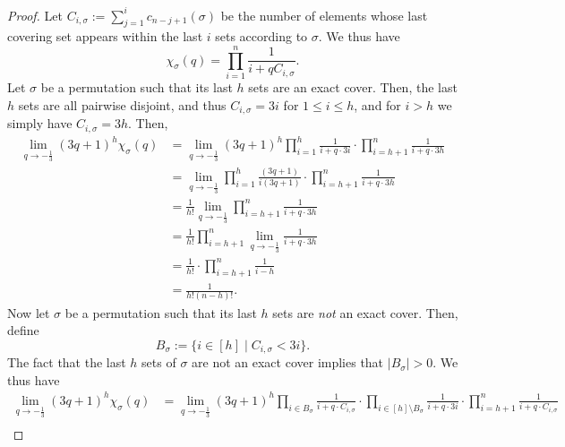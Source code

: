\documentclass[11pt]{amsart}
\begin{document}
\begin{proof}
Let $C_{i, \sigma} := \sum_{j=1}^i c_{n-j+1}(\sigma)$ be the number of elements whose last covering set appears within the last $i$ sets according to $\sigma$. We thus have
\[
    \chi_{\sigma}(q) =  \prod_{i=1}^n \frac{1}{i + q C_{i, \sigma} }.
\]
Let $\sigma$ be a permutation such that its last $h$ sets are an exact cover. Then, the last $h$ sets are all pairwise disjoint, and thus $C_{i, \sigma} = 3i$ for $1 \leq i \leq h$, and for $i > h$ we simply have $C_{i, \sigma} = 3h$.
Then,
 \begin{align*}
     \lim_{q \to -\frac{1}{3}} (3q+1)^h\chi_{\sigma}(q) &= \lim_{q \to -\frac{1}{3}}  (3q+1)^h \prod_{i=1}^{h} \frac{1}{i + q\cdot 3i }  \cdot \prod_{i=h+1}^{n} \frac{1}{i + q\cdot 3h }\\
     &= \lim_{q \to -\frac{1}{3}}   \prod_{i=1}^{h} \frac{(3q+1)}{i(3q+1)}  \cdot \prod_{i=h+1}^{n} \frac{1}{i + q\cdot 3h }\\
     &= \frac{1}{h!} \lim_{q \to -\frac{1}{3}}  \prod_{i=h+1}^{n} \frac{1}{i + q\cdot 3h }\\
     &= \frac{1}{h!} \prod_{i=h+1}^{n} \lim_{q \to -\frac{1}{3}} \frac{1}{i + q\cdot 3h }\\
     &= \frac{1}{h!} \cdot \prod_{i=h+1}^{n} \frac{1}{i - h } \\
     &= \frac{1}{h! (n-h)!}.
 \end{align*}
 Now let $\sigma$ be a permutation such that its last $h$ sets are \emph{not} an exact cover. Then, define \[B_\sigma := \{ i \in [h] \mid C_{i, \sigma} < 3i \}.\] The fact that the last $h$ sets of $\sigma$ are not an exact cover implies that $|B_\sigma| > 0$.
 We thus have
\begin{align*}
      \lim_{q \to -\frac{1}{3}} (3q+1)^h\chi_{\sigma}(q) &= \lim_{q \to -\frac{1}{3}}  (3q+1)^h \prod_{i \in B_\sigma} \frac{1}{i + q \cdot C_{i, \sigma}}  \cdot \prod_{i \in [h] \setminus B_\sigma} \frac{1}{i + q \cdot 3i}  \cdot \prod_{i=h+1}^{n} \frac{1}{i + q\cdot C_{i, \sigma} }\\

\end{align*}
\end{proof}
\end{document}

